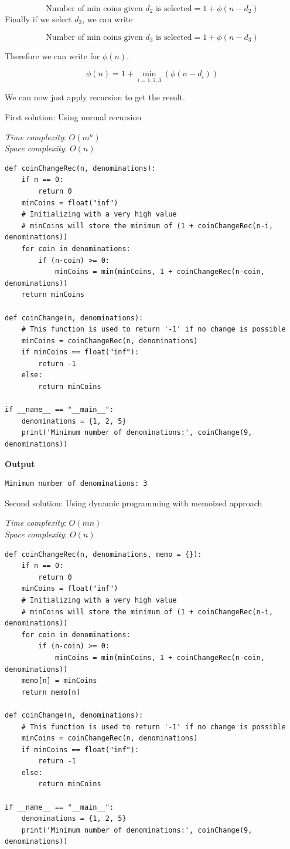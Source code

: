 \documentclass[a4paper,11pt]{book}
\begin{document}
$$\text{Number of min coins given $d_2$ is selected} = 1 + \phi(n-d_2)$$
\noindent Finally if we select $d_3$, we can write

$$\text{Number of min coins given $d_3$ is selected} = 1 + \phi(n-d_3)$$

\noindent Therefore we can write for $\phi(n)$,

$$\phi(n) = 1 + \min_{i=1,2,3} \left(\phi(n-d_i)\right)$$

\noindent We can now just apply recursion to get the result.

\vspace{5mm}

\noindent First solution: Using normal recursion

\noindent \textit{Time complexity}: $O(m^n)$\\
\noindent \textit{Space complexity}: $O(n)$

\begin{lstlisting}
def coinChangeRec(n, denominations):
    if n == 0:
        return 0
    minCoins = float("inf")  
    # Initializing with a very high value
    # minCoins will store the minimum of (1 + coinChangeRec(n-i, denominations))
    for coin in denominations:
        if (n-coin) >= 0:
            minCoins = min(minCoins, 1 + coinChangeRec(n-coin, denominations))
    return minCoins

def coinChange(n, denominations):
    # This function is used to return '-1' if no change is possible
    minCoins = coinChangeRec(n, denominations)
    if minCoins == float("inf"):
        return -1  
    else:
        return minCoins

if __name__ == "__main__":
    denominations = {1, 2, 5}
    print('Minimum number of denominations:', coinChange(9, denominations))
\end{lstlisting}
\textbf{Output}
\begin{lstlisting}
Minimum number of denominations: 3
\end{lstlisting}

\noindent Second solution: Using dynamic programming with memoized approach

\noindent \textit{Time complexity}: $O(mn)$\\
\noindent \textit{Space complexity}: $O(n)$

\begin{lstlisting}
def coinChangeRec(n, denominations, memo = {}):
    if n == 0: 
        return 0
    minCoins = float("inf")  
    # Initializing with a very high value
    # minCoins will store the minimum of (1 + coinChangeRec(n-i, denominations))
    for coin in denominations:
        if (n-coin) >= 0:
            minCoins = min(minCoins, 1 + coinChangeRec(n-coin, denominations))
    memo[n] = minCoins
    return memo[n]

def coinChange(n, denominations):
    # This function is used to return '-1' if no change is possible
    minCoins = coinChangeRec(n, denominations)
    if minCoins == float("inf"):
        return -1  
    else:
        return minCoins

if __name__ == "__main__":
    denominations = {1, 2, 5}
    print('Minimum number of denominations:', coinChange(9, denominations))
\end{lstlisting}
\end{document}
